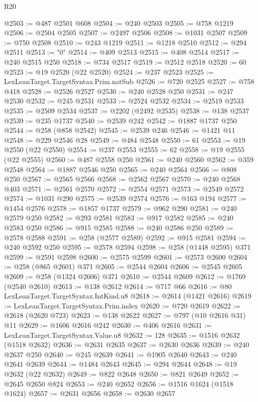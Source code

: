 \begin{lexlean}{R20}
\begin{coremodule}
{@2503 := @487 @2501 @608
@2504 := @240 @2503
@2505 := @758 @1219
@2506 := @2504 @2505
@2507 := @2497 @2506
@2508 := @1031 @2507
@2509 := @750 @2508
@2510 := @243 @1219
@2511 := @1218 @2510
@2512 := @294 @2511
@2513 := "0"
@2514 := @409 @2513
@2515 := @408 @2514
@2517 := @240 @2515 @250
@2518 := @734 @2517
@2519 := @2512 @2518
@2520 := 60
@2523 := @19 @2520 (@22 @2520)
@2524 := @237 @2523
@2525 := LexLeanTarget.TargetSyntax.Prim.natSub
@2526 := @720 @2525
@2527 := @758 @418
@2528 := @2526 @2527
@2530 := @240 @2528 @250
@2531 := @247 @2530
@2532 := @245 @2531
@2533 := @2524 @2532
@2534 := @2519 @2533
@2535 := @2509 @2534
@2537 := @2202 (@2492 @2535)
@2538 := @138 @2537
@2539 := @235 @1737
@2540 := @2539 @242
@2542 := @1887 @1737 @250
@2544 := @258 (@858 @2542)
@2545 := @2539 @246
@2546 := @1421 @11
@2548 := @229 @2546 @28
@2549 := @484 @2548
@2550 := 61
@2553 := @19 @2550 (@22 @2550)
@2554 := @237 @2553
@2555 := 62
@2558 := @19 @2555 (@22 @2555)
@2560 := @487 @2558 @250
@2561 := @240 @2560
@2562 := @359 @2548
@2564 := @1887 @2546 @250
@2565 := @240 @2564
@2566 := @808 @250
@2567 := @2565 @2566
@2568 := @2562 @2567
@2570 := @240 @2568 @403
@2571 := @2561 @2570
@2572 := @2554 @2571
@2573 := @2549 @2572
@2574 := @1031 @290
@2575 := @2539 @2574
@2576 := @163 @194
@2577 := @1454 @2576
@2578 := @1857 @1737
@2579 := @962 @290
@2581 := @240 @2579 @250
@2582 := @293 @2581
@2583 := @917 @2582
@2585 := @240 @2583 @250
@2586 := @915 @2585
@2588 := @240 @2586 @250
@2589 := @2578 @2588
@2591 := @258 (@2577 @2589)
@2592 := @915 @2581
@2594 := @240 @2592 @250
@2595 := @2578 @2594
@2598 := @258 (@1448 @2595) @371
@2599 := @2591 @2598
@2600 := @2575 @2599
@2601 := @2573 @2600
@2604 := @258 (@865 @2601) @371
@2605 := @2544 @2604
@2606 := @2545 @2605
@2609 := @258 (@1324 @2606) @371
@2610 := @2544 @2609
@2612 := @1769 (@2540 @2610)
@2613 := @138 @2612
@2614 := @717 @66
@2616 := @80 LexLeanTarget.TargetSyntax.IntKind.u8
@2618 := @2614 (@1421 @2616)
@2619 := LexLeanTarget.TargetSyntax.Prim.index
@2620 := @720 @2619
@2622 := @2618 (@2620 @723)
@2623 := @138 @2622
@2627 := @797 (@10 @2616 @31) @11
@2629 := @1606 @2616 @242
@2630 := @406 @2616
@2631 := LexLeanTarget.TargetSyntax.Value.u8
@2632 := 128
@2635 := @1516 @2632 (@1518 @2632)
@2636 := @2631 @2635
@2637 := @2630 @2636
@2639 := @240 @2637 @250
@2640 := @245 @2639
@2641 := @1905 @2640
@2643 := @240 @2641 @2639
@2644 := @1484 @2643
@2645 := @294 @2644
@2648 := @19 @2632 (@22 @2632)
@2649 := @822 @2648
@2650 := @821 @2649
@2652 := @2645 @2650 @824
@2653 := @240 @2652
@2656 := @1516 @1624 (@1518 @1624)
@2657 := @2631 @2656
@2658 := @2630 @2657
}
\end{coremodule}
\end{lexlean}
